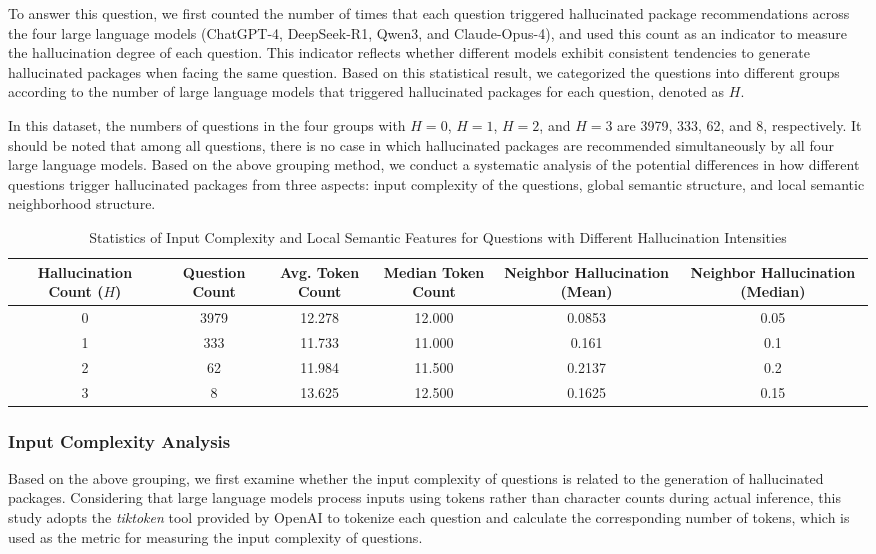 To answer this question, we first counted the number of times that each question triggered hallucinated package recommendations across the four large language models 
(ChatGPT-4, DeepSeek-R1, Qwen3, and Claude-Opus-4), and used this count as an indicator to measure the hallucination degree of each question. This indicator 
reflects whether different models exhibit consistent tendencies to generate hallucinated packages when facing the same question. Based on this statistical result, 
we categorized the questions into different groups according to the number of large language models that triggered hallucinated packages for each question, 
denoted as $H$.

In this dataset, the numbers of questions in the four groups with $H = 0$, $H = 1$, $H = 2$, and $H = 3$ are 3979, 333, 62, and 8, respectively. It should be 
noted that among all questions, there is no case in which hallucinated packages are recommended simultaneously by all four large language models. Based on the 
above grouping method, we conduct a systematic analysis of the potential differences in how different questions trigger hallucinated packages from three aspects: 
input complexity of the questions, global semantic structure, and local semantic neighborhood structure.

\begin{table}[t]
\centering
\caption{Statistics of Input Complexity and Local Semantic Features for Questions with Different Hallucination Intensities}
\label{tab:rq1-3-input-complexity}
\begin{tabular}{c c c c c c}
\toprule
Hallucination Count ($H$) & Question Count & Avg. Token Count & Median Token Count & Neighbor Hallucination (Mean) & Neighbor Hallucination (Median) \\
\midrule
0 & 3979 & 12.278 & 12.000 & 0.0853 & 0.05 \\
1 & 333 & 11.733 & 11.000 & 0.161 & 0.1 \\
2 & 62 & 11.984 & 11.500 & 0.2137 & 0.2 \\
3 & 8 & 13.625 & 12.500 & 0.1625 & 0.15 \\
\bottomrule
\end{tabular}
\end{table}

\subsubsection{Input Complexity Analysis}

Based on the above grouping, we first examine whether the input complexity of questions is related to the generation of hallucinated packages. Considering 
that large language models process inputs using tokens rather than character counts during actual inference, this study adopts the \textit{tiktoken} tool 
provided by OpenAI to tokenize each question and calculate the corresponding number of tokens, which is used as the metric for measuring the input complexity 
of questions.

